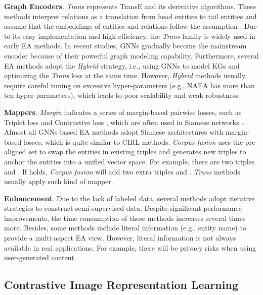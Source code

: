 \documentclass[sigconf]{acmart}
\begin{document}
\vspace{0.5em}
\noindent
\textbf{Graph Encoders}.
\emph{Trans} represents TransE \cite{DBLP:conf/nips/BordesUGWY13} and its derivative algorithms.
These methods interpret relations as a translation from head entities to tail entities and assume that the embeddings of entities and relations follow the assumption .
Due to its easy implementation and high efficiency, the \emph{Trans} family is widely used in early EA methods.
In recent studies, GNNs gradually become the mainstream encoder because of their powerful graph modeling capability.
Furthermore, several EA methods adopt the \emph{Hybrid} strategy, i.e., using GNNs to model KGs and optimizing the \emph{Trans} loss at the same time.
However, \emph{Hybrid} methods usually require careful tuning on excessive hyper-parameters (e.g., NAEA has more than ten hyper-parameters), which leads to poor scalability and weak robustness.

\vspace{0.5em}
\noindent
\textbf{Mappers}.
\emph{Margin} indicates a series of margin-based pairwise losses, such as Triplet loss \cite{DBLP:conf/cvpr/SchroffKP15} and Contrastive loss \cite{DBLP:conf/cvpr/HadsellCL06}, which are often used in Siamese networks \cite{DBLP:conf/nips/BromleyGLSS93}.
Almost all GNNs-based EA methods adopt Siamese architectures with margin-based losses, which is quite similar to CIRL methods.
\emph{Corpus fusion} uses the pre-aligned set to swap the entities in existing triples and generates new triples to anchor the entities into a unified vector space.
For example, there are two triples  and .
If  holds, \emph{Corpus fusion} will add two extra triples  and .
\emph{Trans} methods usually apply such kind of mapper.

\vspace{0.5em}
\noindent
\textbf{Enhancement}.
Due to the lack of labeled data, several methods \cite{DBLP:conf/ijcai/SunHZQ18,DBLP:conf/ijcai/ZhuZ0TG19,DBLP:conf/wsdm/MaoWXLW20} adopt iterative strategies to construct semi-supervised data.
Despite significant performance improvements, the time consumption of these methods increases several times more.
Besides, some methods \cite{DBLP:conf/acl/XuWYFSWY19, DBLP:conf/ijcai/WuLF0Y019, DBLP:conf/emnlp/YangZSLLS19} include literal information (e.g., entity name) to provide a multi-aspect EA view.
However, literal information is not always available in real applications.
For example, there will be privacy risks when using user-generated content.

\subsection{Contrastive Image Representation Learning}
\end{document}
